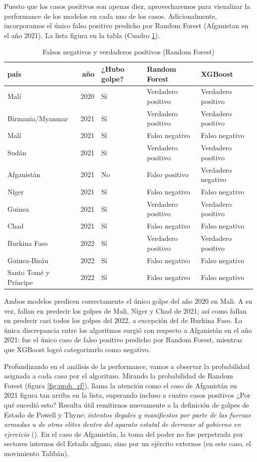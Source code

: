 \documentclass{article}
\begin{document}
Puesto que los casos positivos son apenas diez, aprovecharemos para visualizar la performance
de los modelos en cada uno de los casos. Adicionalmente, incorporamos el único falso positivo
predicho por Random Forest (Afganistan en el año 2021). La lista figura en la 
tabla (Cuadro \ref{tab:resultados}).

\begin{table}[H]
  \centering
    \begin{tabular}{lrlll}
      \toprule
      país & año & ¿Hubo golpe? & Random Forest & XGBoost \\
      \midrule
      Malí & 2020 & Sí & Verdadero positivo & Verdadero positivo \\
      Birmania/Myanmar & 2021 & Sí & Verdadero positivo & Verdadero positivo \\
      Malí & 2021 & Sí & Falso negativo & Falso negativo \\
      Sudán & 2021 & Sí & Verdadero positivo & Verdadero positivo \\
      Afganistán & 2021 & No & Falso positivo & Verdadero negativo \\
      Níger & 2021 & Sí & Falso negativo & Falso negativo \\
      Guinea & 2021 & Sí & Verdadero positivo & Verdadero positivo \\
      Chad & 2021 & Sí & Falso negativo & Falso negativo \\
      Burkina Faso & 2022 & Sí & Verdadero positivo & Verdadero positivo \\
      Guinea-Bisáu & 2022 & Sí & Falso negativo & Falso negativo \\
      Santo Tomé y Príncipe & 2022 & Sí & Falso negativo & Falso negativo \\
      \bottomrule
    \end{tabular}
  \caption{Falsos negativos y verdaderos positivos (Random Forest) \label{tab:resultados}}
\end{table}

Ambos modelos predicen correctamente el único golpe del año 2020 en Mali. A su
vez, fallan en predecir los golpes de Mali, Níger y Chad de 2021; así como fallan en predecir
casi todos los golpes del 2022, a excepción del de Burkina Faso. La única discrepancia entre
los algoritmos surgió con respecto a Afganistán en el año 2021: fue el único caso de falso
positivo predicho por Random Forest, mientras que XGBoost logró categorizarlo como negativo.

Profundizando en el análisis de la performance, vamos a observar la probabilidad asignada
a cada caso por el algoritmo. Mirando la probabilidad de Random Forest 
(figura \ref{fig:prob_rf}), llama la atención como el caso de Afganistán en 2021 figura
tan arriba en la lista, superando incluso a cuatro casos positivos ¿Por qué sucedió esto?
Resulta útil remitirnos nuevamente a la definición de golpes de Estado de Powell y Thyne:
\textit{intentos ilegales y manifiestos por parte de las fuerzas armadas u de otras elites dentro
del aparato estatal de derrocar al gobierno en ejercicio} (\cite[p.~252]{Pow11}). En el caso de 
Afganistán, la toma del poder no fue perpetrada por sectores internos del Estado afgano, sino
por un ejército externos (en este caso, el movimiento Talibán).
\end{document}
